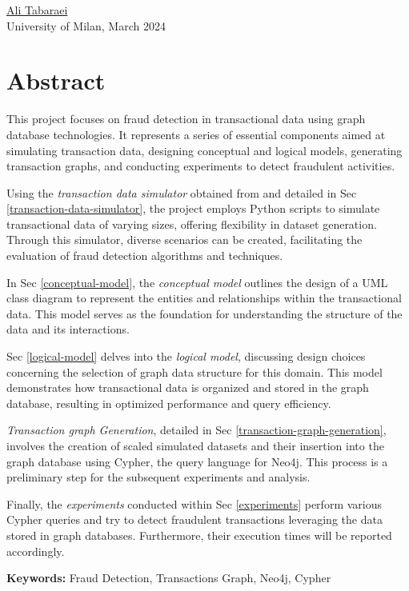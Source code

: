 \vspace*{-0.7cm}
    \underline{Ali Tabaraei} \\
    University of Milan, March 2024 \\
\vspace*{-0.7cm}

\section*{Abstract}

This project \cite{github} focuses on fraud detection in transactional data using graph database technologies. It represents a series of essential components aimed at simulating transaction data, designing conceptual and logical models, generating transaction graphs, and conducting experiments to detect fraudulent activities.

Using the \textit{transaction data simulator} obtained from \cite{leborgne2022fraud} and detailed in Sec \ref{transaction-data-simulator}, the project employs Python scripts to simulate transactional data of varying sizes, offering flexibility in dataset generation. Through this simulator, diverse scenarios can be created, facilitating the evaluation of fraud detection algorithms and techniques.

In Sec \ref{conceptual-model}, the \textit{conceptual model} outlines the design of a UML class diagram to represent the entities and relationships within the transactional data. This model serves as the foundation for understanding the structure of the data and its interactions.

Sec \ref{logical-model} delves into the \textit{logical model}, discussing design choices concerning the selection of graph data structure for this domain. This model demonstrates how transactional data is organized and stored in the graph database, resulting in optimized performance and query efficiency.

\textit{Transaction graph Generation}, detailed in Sec \ref{transaction-graph-generation}, involves the creation of scaled simulated datasets and their insertion into the graph database using Cypher, the query language for Neo4j. This process is a preliminary step for the subsequent experiments and analysis.

Finally, the \textit{experiments} conducted within Sec \ref{experiments} perform various Cypher queries and try to detect fraudulent transactions leveraging the data stored in graph databases. Furthermore, their execution times will be reported accordingly.

\textbf{Keywords:} Fraud Detection, Transactions Graph, Neo4j, Cypher
\newpage

